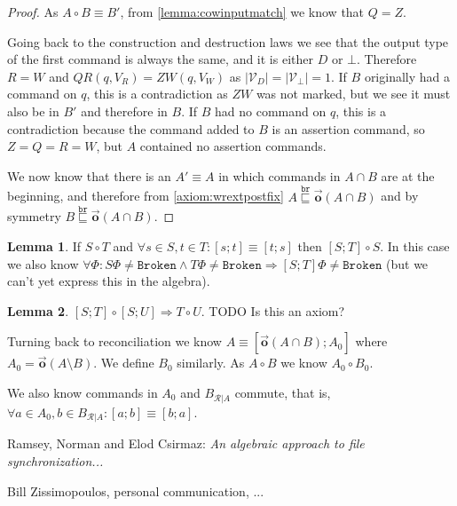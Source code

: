 \documentclass[12pt]{article}
\newcommand{\setvx}[1]{\mathcal{V}_{#1}}
\newcommand{\setd}{\setvx{D}}
\newcommand{\setb}{\setvx{\empt}}
\newcommand{\empt}{\bot}
\newcommand{\fsbroken}{\mathtt{Broken}} %
\newcommand{\FS}{\Phi} %
\newcommand{\fscommand}[2]{{#1#2}}
\newcommand{\czw}{\fscommand{Z}{W}}
\newcommand{\cqr}{\fscommand{Q}{R}}
\newcommand{\wrext}{\stackrel{\mathtt{br}}{\sqsubseteq}}
\newcommand{\coworks}{\circ}
\newcommand{\ordered}[1]{\vec{\mathbf{o}}({#1})}
\newcommand{\recchar}[3]{{#1}^{#3}_{\mathcal{R}|{#2}}}
\newcommand{\recb}{\recchar{B}{A}{}}
\theoremstyle{definition}
\newtheorem{mylem}{Lemma}
\begin{document}
\begin{proof}
As $A\coworks B\equiv B'$, 
from \cref{lemma:cowinputmatch}
we know that $Q=Z$. 

Going back to the construction and destruction laws we see that the output type of the first command
is always the same, and it is either $D$ or $\empt$. Therefore $R=W$ and $\cqr(q, V_R)=\czw(q, V_W)$
as $|\setd|=|\setb|=1$. 
If $B$ originally had a command on $q$,
this is a contradiction as $\czw$ was not marked, but we see it must also be in $B'$ and therefore in $B$.
If $B$ had no command on $q$,
this is a contradiction because the command added to $B$ is an assertion command, so $Z=Q=R=W$, 
but $A$ contained no assertion commands.

\medskip

We now know that there is an $A'\equiv A$ in which commands in $A\cap B$
are at the beginning, and therefore 
from \cref{axiom:wrextpostfix}
$A\wrext \ordered{A\cap B}$ and by symmetry $B\wrext \ordered{A\cap B}$.
\end{proof}

\medskip

\begin{mylem}
If $S\coworks T$ and $\forall s\in S, t\in T: [s;t]\equiv[t;s]$
then $[S;T]\coworks S$.
In this case we also know
$\forall \FS: S\FS\neq\fsbroken \wedge T\FS\neq\fsbroken \Rightarrow [S;T]\FS\neq\fsbroken$
(but we can't yet express this in the algebra).
\end{mylem}

\begin{mylem}
$[S;T]\coworks[S;U]\Rightarrow T\coworks U$.
TODO Is this an axiom?
\end{mylem}

Turning back to reconciliation we know
$A\equiv[\ordered{A\cap B};A_0]$
where $A_0=\ordered{A\setminus B}$.
We define $B_0$ similarly.
As $A\coworks B$ we know $A_0\coworks B_0$.

We also know commands in $A_0$ and $\recb$ commute, that is,
$\forall a\in A_0, b\in\recb: [a;b]\equiv[b;a]$.



\begin{thebibliography}{99}

 Ramsey, Norman and Elod Csirmaz: {\it An algebraic approach to
file synchronization...}

 Bill Zissimopoulos, personal communication, ...

\end{thebibliography}
\end{document}
